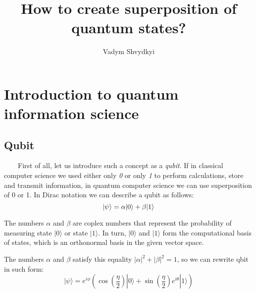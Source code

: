\documentclass[english,14pt,a4paper]{article}
\title{How to create superposition of quantum states?}
\author{Vadym Shvydkyi}
\begin{document}
	\maketitle
	\tableofcontents
	\pagebreak
	\section{Introduction to quantum information science}
	\subsection{Qubit} \ \ \ \
	First of all, let us introduce such a concept as a \textit{qubit}. If in classical computer science we used either only \textit{0} or only \textit{1} to perform calculations, store and transmit information, in quantum computer science we can use superposition of 0 or 1. In Dirac notation we can describe a qubit as follows:
	\begin{equation}
		\ket{\psi}  = \alpha | 0 \rangle + \beta | 1 \rangle
	\end{equation}
	
	The numbers $\alpha$ and $\beta$ are coplex numbers that represent the probability of measuring state $| 0 \rangle $ or state $| 1 \rangle $. In turn, $| 0 \rangle $ and $| 1 \rangle $ form the computational basis of states, which is an orthonormal basis in the given vector space. 
	
	The numbers $\alpha$ and $\beta$ satisfy this equality $|\alpha|^2 + |\beta|^2 = 1$, so we can rewrite qbit in such form:
	\begin{equation}
		| \psi \rangle = e^{i\phi}( \cos(\frac{\eta}{2})| 0 \rangle + \sin(\frac{\eta}{2})e^{i\theta}| 1 \rangle)
	\end{equation} 
	 
\end{document}
